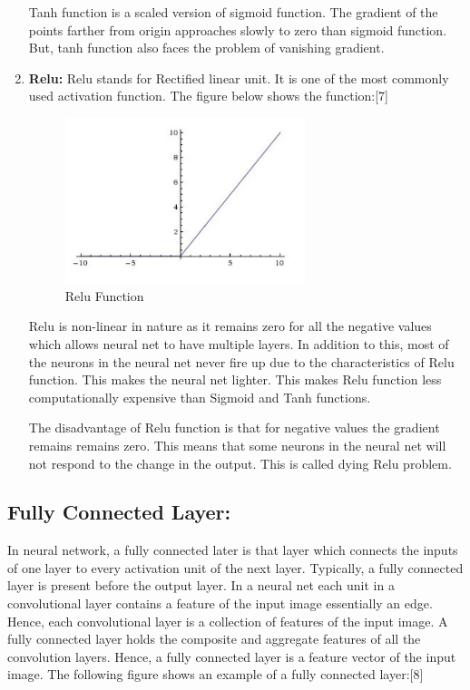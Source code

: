 \documentclass{IEEEtran}
\begin{document}
\begin{enumerate}
Tanh function is a scaled version of sigmoid function. The gradient of the points farther from origin approaches slowly to zero than sigmoid function. But, tanh function also faces the problem of vanishing gradient.

\item \textbf{Relu:} Relu stands for Rectified linear unit. It is one of the most commonly used activation function. The figure below shows the function:[7]
\newpage

\begin{figure}[h]
    \centering
    \captionsetup{justification=centering}
    \includegraphics[width=7cm]{relu}
    \caption{Relu Function}
    \label{fig: Relu Function}
\end{figure}

Relu is non-linear in nature as it remains zero for all the negative values which allows neural net to have multiple layers. In addition to this, most of the neurons in the neural net never fire up due to the characteristics of Relu function. This makes the neural net lighter. This makes Relu function less computationally expensive than Sigmoid and Tanh functions.

The disadvantage of Relu function is that for negative values the gradient remains remains zero. This means that some neurons in the neural net will not respond to the change in the output. This is called dying Relu problem.
\end{enumerate} 

\subsection{\textbf{Fully Connected Layer:}}
In neural network, a fully connected later is that layer which connects the inputs of one layer to every activation unit of the next layer. Typically, a fully connected layer is present before the output layer. In a neural net each unit in a convolutional layer contains a feature of the input image essentially an edge. Hence, each convolutional layer is a collection of features of the input image. A fully connected layer holds the composite and aggregate features of all the convolution layers. Hence, a fully connected layer is a feature vector of the input image. The following figure shows an example of a fully connected layer:[8]
\end{document}
